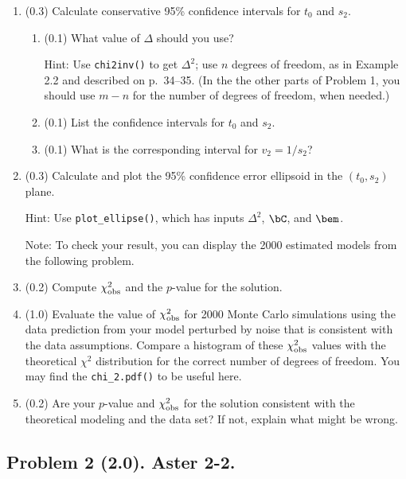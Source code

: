 \documentclass[11pt,titlepage,fleqn]{article}
\begin{document}
\begin{enumerate}
\pagebreak
\item (0.3) Calculate conservative 95\% confidence intervals for $t_0$ and $s_2$.
%
\begin{enumerate}
\item (0.1) What value of $\Delta$ should you use?

Hint: Use \verb+chi2inv()+ to get $\Delta^2$; use $n$ degrees of freedom, as in Example 2.2 and described on p.~34--35. (In the the other parts of Problem 1, you should use $m-n$ for the number of degrees of freedom, when needed.)

\item (0.1) List the confidence intervals for $t_0$ and $s_2$.
\item (0.1) What is the corresponding interval for $v_2 = 1/s_2$?
\end{enumerate}

\item (0.3) Calculate and plot the 95\% confidence error ellipsoid in the $(t_0, s_2)$ plane.

Hint: Use \verb+plot_ellipse()+, which has inputs $\Delta^2$, $\bC$, and $\bem$.

Note: To check your result, you can display the 2000 estimated models from the following problem.

\item (0.2) Compute $\chi^2_{\rm obs}$ and the $p$-value for the solution.

\item (1.0) Evaluate the value of $\chi^2_{\rm obs}$ for 2000 Monte Carlo simulations using the data prediction from your model perturbed by noise that is consistent with the data assumptions. Compare a histogram of these $\chi^2_{\rm obs}$ values with the theoretical $\chi^2$ distribution for the correct number of degrees of freedom.
You may find the \verb+chi_2.pdf()+ to be useful here.

\label{monte}

\item (0.2) Are your $p$-value and $\chi^2_{\rm obs}$ for the solution consistent with the theoretical modeling and the data set? If not, explain what might be wrong.

\end{enumerate}


\subsection*{Problem 2 (2.0). Aster 2-2.}
\end{document}
